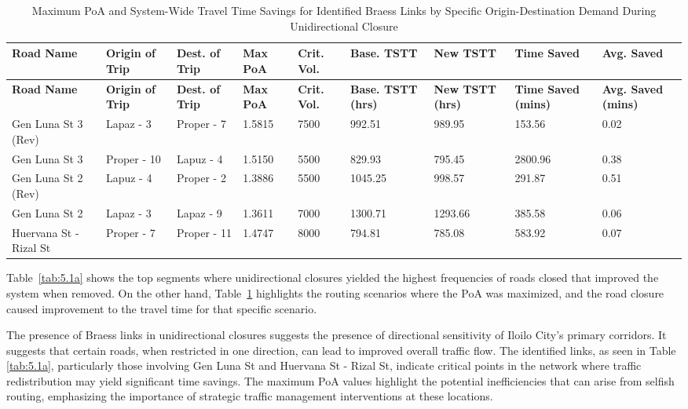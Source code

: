 {
\footnotesize
\setlength{\tabcolsep}{1.5pt}  
\renewcommand{\thetable}{4.2a}
\begin{longtable}{|p{2.5cm}|p{1.5cm}|p{1.6cm}|p{1.2cm}|p{1.4cm}|p{1.4cm}|p{1.4cm}|p{1.3cm}|p{1.3cm}|} 


    
\hline
\textbf{Road Name} & \textbf{Origin of Trip} & \textbf{Dest. of Trip} & \textbf{Max PoA} & \textbf{Crit. Vol.} & \textbf{Base. TSTT} & \textbf{New TSTT} & \textbf{Time Saved} & \textbf{Avg. Saved} \\ \hline
\endfirsthead

\hline
\textbf{Road Name} & \textbf{Origin of Trip} & \textbf{Dest. of Trip} & \textbf{Max PoA} & \textbf{Crit. Vol.} & \textbf{Base. TSTT (hrs)} & \textbf{New TSTT (hrs)} & \textbf{Time Saved (mins)} & \textbf{Avg. Saved (mins)} \\ \hline
\endhead

\hline
\endfoot

\hline
\caption{Maximum PoA and System-Wide Travel Time Savings for Identified Braess Links by Specific Origin-Destination Demand During Unidirectional Closure}
\label{tab:5.2a}
\endlastfoot

Gen Luna St 3 (Rev) & Lapaz - 3 & Proper - 7 & 1.5815 & 7500 & 992.51 & 989.95 & 153.56 & 0.02 \\ \hline
Gen Luna St 3 & Proper - 10 & Lapuz - 4 & 1.5150 & 5500 & 829.93 & 795.45 & 2800.96 & 0.38 \\ \hline
Gen Luna St 2 (Rev) & Lapuz - 4 & Proper - 2 & 1.3886 & 5500 & 1045.25 & 998.57 & 291.87 & 0.51 \\ \hline
Gen Luna St 2 & Lapaz - 3 & Lapaz - 9 & 1.3611 & 7000 & 1300.71 & 1293.66 & 385.58 & 0.06 \\ \hline
Huervana St - Rizal St & Proper - 7 & Proper - 11 & 1.4747 & 8000 & 794.81 & 785.08 & 583.92 & 0.07 \\ 

\end{longtable}
}

Table~\ref{tab:5.1a} shows the top segments where unidirectional closures yielded the highest frequencies of roads closed that improved the system when removed. On the other hand, Table~\ref{tab:5.2a} highlights the routing scenarios where the PoA was maximized, and the road closure caused improvement to the travel time for that specific scenario.

The presence of Braess links in unidirectional closures suggests the presence of directional sensitivity of Iloilo City's primary corridors. It suggests that certain roads, when restricted in one direction, can lead to improved overall traffic flow. The identified links, as seen in Table  \ref{tab:5.1a}, particularly those involving Gen Luna St and Huervana St - Rizal St, indicate critical points in the network where traffic redistribution may yield significant time savings. The maximum PoA values highlight the potential inefficiencies that can arise from selfish routing, emphasizing the importance of strategic traffic management interventions at these locations.

